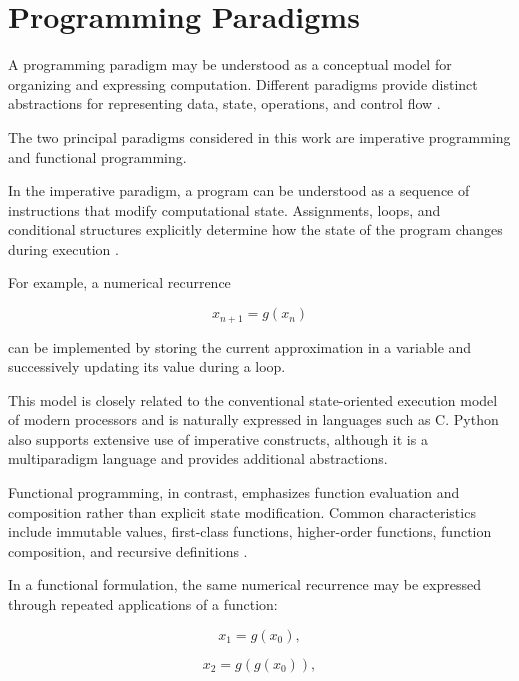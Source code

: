 
\section{Programming Paradigms}

A programming paradigm may be understood as a conceptual model for organizing
and expressing computation. Different paradigms provide distinct abstractions
for representing data, state, operations, and control flow
\cite{scott2015programming}.

The two principal paradigms considered in this work are imperative programming
and functional programming.

In the imperative paradigm, a program can be understood as a sequence of
instructions that modify computational state. Assignments, loops, and
conditional structures explicitly determine how the state of the program
changes during execution
\cite{scott2015programming,kernighan1988c}.

For example, a numerical recurrence

\begin{equation}
    x_{n+1} = g(x_n)
\end{equation}

can be implemented by storing the current approximation in a variable and
successively updating its value during a loop.

This model is closely related to the conventional state-oriented execution
model of modern processors and is naturally expressed in languages such as C.
Python also supports extensive use of imperative constructs, although it is a
multiparadigm language and provides additional abstractions.

Functional programming, in contrast, emphasizes function evaluation and
composition rather than explicit state modification. Common characteristics
include immutable values, first-class functions, higher-order functions,
function composition, and recursive definitions
\cite{hughes1989functional,hutton2016programming}.

In a functional formulation, the same numerical recurrence may be expressed
through repeated applications of a function:

\begin{equation}
    x_1 = g(x_0),
\end{equation}

\begin{equation}
    x_2 = g(g(x_0)),
\end{equation}

